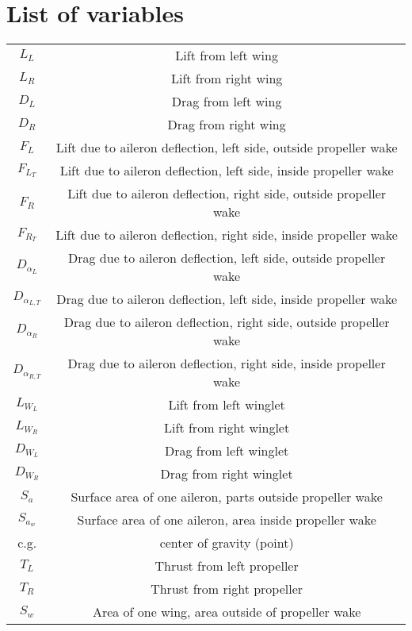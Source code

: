 \section{List of variables}
\begin{center}\begin{tabular}{| c | c |} 
    $L_L$       & Lift from left wing \\
    $L_R$       & Lift from right wing \\
    $D_L$       & Drag from left wing \\
    $D_R$       & Drag from right wing \\
    $F_L$       & Lift due to aileron deflection, left side, outside propeller wake \\
    $F_{L_T}$   & Lift due to aileron deflection, left side, inside propeller wake \\
    $F_R$       & Lift due to aileron deflection, right side, outside propeller wake \\
    $F_{R_T}$   & Lift due to aileron deflection, right side, inside propeller wake \\
    $D_{\alpha_L}$ & Drag due to aileron deflection, left side, outside propeller wake \\
    $D_{\alpha_{L,T}}$ & Drag due to aileron deflection, left side, inside propeller wake \\
    $D_{\alpha_{R}}$ & Drag due to aileron deflection, right side, outside propeller wake \\
    $D_{\alpha_{R,T}}$ & Drag due to aileron deflection, right side, inside propeller wake \\
    $L_{W_L}$ & Lift from left winglet \\
    $L_{W_R}$ & Lift from right winglet \\
    $D_{W_L}$ & Drag from left winglet \\
    $D_{W_R}$ & Drag from right winglet \\
    $S_a$  & Surface area of one aileron, parts outside propeller wake \\
    $S_{a_w}$ & Surface area of one aileron, area inside propeller wake \\
    c.g.    & center of gravity (point) \\
    $T_L$   & Thrust from left propeller \\ 
    $T_R$   & Thrust from right propeller \\
    $S_w$   & Area of one wing, area outside of propeller wake \\

\end{tabular}
\end{center}
